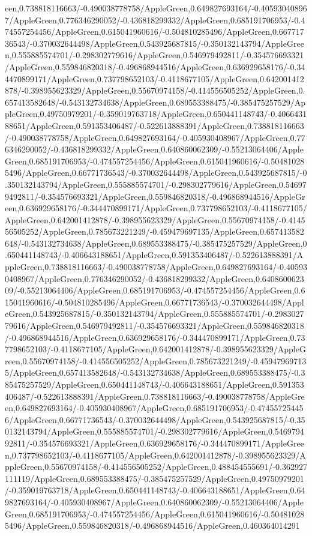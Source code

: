 {\begin{tikzternal}
{een,0.738818116663/-0.490038778758/AppleGreen,0.649827693164/-0.405930408967/AppleGreen,0.776346290052/-0.436818299332/AppleGreen,0.685191706953/-0.474557254456/AppleGreen,0.615041960616/-0.504810285496/AppleGreen,0.66771736543/-0.370032644498/AppleGreen,0.543925687815/-0.350132143794/AppleGreen,0.555885574701/-0.298302779616/AppleGreen,0.546979492811/-0.354576693321/AppleGreen,0.559846820318/-0.496868944516/AppleGreen,0.636929658176/-0.344470899171/AppleGreen,0.737798652103/-0.4118677105/AppleGreen,0.642001412878/-0.398955623329/AppleGreen,0.55670974158/-0.414556505252/AppleGreen,0.657413582648/-0.543132734638/AppleGreen,0.689553388475/-0.385475257529/AppleGreen,0.49750979201/-0.359019763718/AppleGreen,0.650441148743/-0.406643188651/AppleGreen,0.591353406487/-0.522613888391/AppleGreen,0.738818116663/-0.490038778758/AppleGreen,0.649827693164/-0.405930408967/AppleGreen,0.776346290052/-0.436818299332/AppleGreen,0.640860062309/-0.55213064406/AppleGreen,0.685191706953/-0.474557254456/AppleGreen,0.615041960616/-0.504810285496/AppleGreen,0.66771736543/-0.370032644498/AppleGreen,0.543925687815/-0.350132143794/AppleGreen,0.555885574701/-0.298302779616/AppleGreen,0.546979492811/-0.354576693321/AppleGreen,0.559846820318/-0.496868944516/AppleGreen,0.636929658176/-0.344470899171/AppleGreen,0.737798652103/-0.4118677105/AppleGreen,0.642001412878/-0.398955623329/AppleGreen,0.55670974158/-0.414556505252/AppleGreen,0.785673221249/-0.459479697135/AppleGreen,0.657413582648/-0.543132734638/AppleGreen,0.689553388475/-0.385475257529/AppleGreen,0.650441148743/-0.406643188651/AppleGreen,0.591353406487/-0.522613888391/AppleGreen,0.738818116663/-0.490038778758/AppleGreen,0.649827693164/-0.405930408967/AppleGreen,0.776346290052/-0.436818299332/AppleGreen,0.640860062309/-0.55213064406/AppleGreen,0.685191706953/-0.474557254456/AppleGreen,0.615041960616/-0.504810285496/AppleGreen,0.66771736543/-0.370032644498/AppleGreen,0.543925687815/-0.350132143794/AppleGreen,0.555885574701/-0.298302779616/AppleGreen,0.546979492811/-0.354576693321/AppleGreen,0.559846820318/-0.496868944516/AppleGreen,0.636929658176/-0.344470899171/AppleGreen,0.737798652103/-0.4118677105/AppleGreen,0.642001412878/-0.398955623329/AppleGreen,0.55670974158/-0.414556505252/AppleGreen,0.785673221249/-0.459479697135/AppleGreen,0.657413582648/-0.543132734638/AppleGreen,0.689553388475/-0.385475257529/AppleGreen,0.650441148743/-0.406643188651/AppleGreen,0.591353406487/-0.522613888391/AppleGreen,0.738818116663/-0.490038778758/AppleGreen,0.649827693164/-0.405930408967/AppleGreen,0.685191706953/-0.474557254456/AppleGreen,0.66771736543/-0.370032644498/AppleGreen,0.543925687815/-0.350132143794/AppleGreen,0.555885574701/-0.298302779616/AppleGreen,0.546979492811/-0.354576693321/AppleGreen,0.636929658176/-0.344470899171/AppleGreen,0.737798652103/-0.4118677105/AppleGreen,0.642001412878/-0.398955623329/AppleGreen,0.55670974158/-0.414556505252/AppleGreen,0.488454555691/-0.362927111119/AppleGreen,0.689553388475/-0.385475257529/AppleGreen,0.49750979201/-0.359019763718/AppleGreen,0.650441148743/-0.406643188651/AppleGreen,0.649827693164/-0.405930408967/AppleGreen,0.640860062309/-0.55213064406/AppleGreen,0.685191706953/-0.474557254456/AppleGreen,0.615041960616/-0.504810285496/AppleGreen,0.559846820318/-0.496868944516/AppleGreen,0.460364014291}
\end{tikzternal}}
